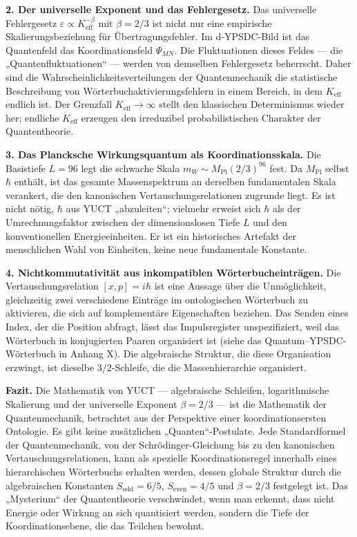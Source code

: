 \documentclass[11pt,a4paper]{article}
\begin{document}
	\medskip
	\noindent\textbf{2. Der universelle Exponent und das Fehlergesetz.}
	Das universelle Fehlergesetz $\varepsilon \propto K_{\mathrm{eff}}^{-\beta}$ mit $\beta = 2/3$ ist nicht nur eine empirische Skalierungsbeziehung für Übertragungsfehler. Im d‑YPSDC-Bild ist das Quantenfeld das Koordinationsfeld $\Psi_{MN}$. Die Fluktuationen dieses Feldes — die „Quantenfluktuationen“ — werden von demselben Fehlergesetz beherrscht. Daher sind die Wahrscheinlichkeitsverteilungen der Quantenmechanik die statistische Beschreibung von Wörterbuchaktivierungsfehlern in einem Bereich, in dem $K_{\mathrm{eff}}$ endlich ist. Der Grenzfall $K_{\mathrm{eff}}\to\infty$ stellt den klassischen Determinismus wieder her; endliche $K_{\mathrm{eff}}$ erzeugen den irreduzibel probabilistischen Charakter der Quantentheorie.
	
	\medskip
	\noindent\textbf{3. Das Plancksche Wirkungsquantum als Koordinationsskala.}
	Die Basistiefe $L=96$ legt die schwache Skala $m_W \sim M_{\mathrm{Pl}}(2/3)^{96}$ fest. Da $M_{\mathrm{Pl}}$ selbst $\hbar$ enthält, ist das gesamte Massenspektrum an derselben fundamentalen Skala verankert, die den kanonischen Vertauschungsrelationen zugrunde liegt. Es ist nicht nötig, $\hbar$ aus YUCT „abzuleiten“; vielmehr erweist sich $\hbar$ als der Umrechnungsfaktor zwischen der dimensionslosen Tiefe $L$ und den konventionellen Energieeinheiten. Er ist ein historisches Artefakt der menschlichen Wahl von Einheiten, keine neue fundamentale Konstante.
	
	\medskip
	\noindent\textbf{4. Nichtkommutativität aus inkompatiblen Wörterbucheinträgen.}
	Die Vertauschungsrelation $[x,p]=i\hbar$ ist eine Aussage über die Unmöglichkeit, gleichzeitig zwei verschiedene Einträge im ontologischen Wörterbuch zu aktivieren, die sich auf komplementäre Eigenschaften beziehen. Das Senden eines Index, der die Position abfragt, lässt das Impulsregister unspezifiziert, weil das Wörterbuch in konjugierten Paaren organisiert ist (siehe das Quantum–YPSDC-Wörterbuch in Anhang X). Die algebraische Struktur, die diese Organisation erzwingt, ist dieselbe $3/2$-Schleife, die die Massenhierarchie organisiert.
	
	\medskip
	\noindent
	\textbf{Fazit.} Die Mathematik von YUCT — algebraische Schleifen, logarithmische Skalierung und der universelle Exponent $\beta=2/3$ — ist die Mathematik der Quantenmechanik, betrachtet aus der Perspektive einer koordinationsersten Ontologie. Es gibt keine zusätzlichen „Quanten“-Postulate. Jede Standardformel der Quantenmechanik, von der Schrödinger-Gleichung bis zu den kanonischen Vertauschungsrelationen, kann als spezielle Koordinationsregel innerhalb eines hierarchischen Wörterbuchs erhalten werden, dessen globale Struktur durch die algebraischen Konstanten $S_{\mathrm{odd}}=6/5$, $S_{\mathrm{even}}=4/5$ und $\beta=2/3$ festgelegt ist. Das „Mysterium“ der Quantentheorie verschwindet, wenn man erkennt, dass nicht Energie oder Wirkung an sich quantisiert werden, sondern die Tiefe der Koordinationsebene, die das Teilchen bewohnt.
	
\end{document}
